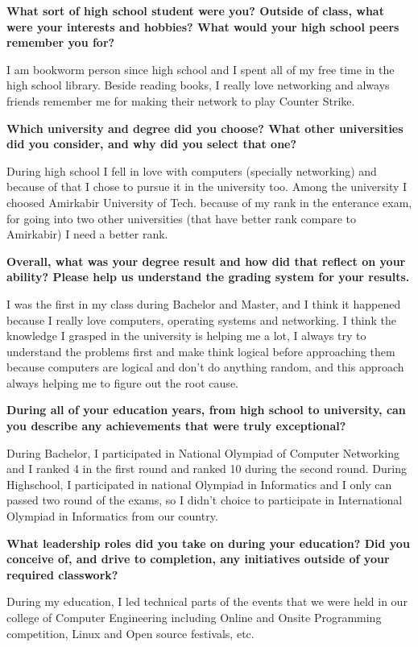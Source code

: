 \noindent
\textbf{What sort of high school student were you? Outside of class, what were your interests and hobbies? What would your high school peers remember you for?}

I am bookworm person since high school and I spent all of my free time in the high school library.
Beside reading books, I really love networking and always friends remember me for making their network to play Counter Strike.

\noindent
\textbf{Which university and degree did you choose? What other universities did you consider, and why did you select that one?}

During high school I fell in love with computers (specially networking) and because of that I chose to pursue
it in the university too. Among the university I choosed Amirkabir University of Tech. because of my rank in the enterance exam,
for going into two other universities (that have better rank compare to Amirkabir) I need a better rank.

\noindent
\textbf{Overall, what was your degree result and how did that reflect on your ability? Please help us understand the grading system for your results.}

I was the first in my class during Bachelor and Master, and I think it happened because I really love computers,
operating systems and networking. I think the knowledge I grasped in the university is helping me a lot, I always
try to understand the problems first and make think logical before approaching them because computers are logical
and don't do anything random, and this approach always helping me to figure out the root cause.

\noindent
\textbf{During all of your education years, from high school to university, can you describe any achievements that were truly exceptional?}

During Bachelor, I participated in National Olympiad of Computer Networking and I ranked 4 in the first round and ranked
10 during the second round.
During Highschool, I participated in national Olympiad in Informatics and I only can passed two round of the exams, so
I didn't choice to participate in International Olympiad in Informatics from our country.

\noindent
\textbf{What leadership roles did you take on during your education?
Did you conceive of, and drive to completion, any initiatives outside of your required classwork?}

During my education, I led technical parts of the events that we were held in our college of Computer Engineering including
Online and Onsite Programming competition, Linux and Open source festivals, etc.

